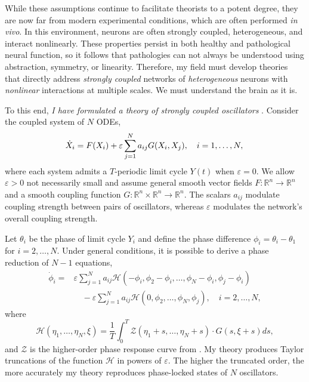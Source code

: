 \documentclass[a4paper,11pt]{article}
\newcommand{\ve}{\varepsilon}
\newcommand{\h}{\mathcal{H}}
\begin{document}
	While these assumptions continue to facilitate theorists to a potent degree, they are now far from modern experimental conditions, which are often performed \textit{in vivo}. In this environment, neurons are often strongly coupled, heterogeneous, and interact nonlinearly. These properties persist in both healthy and pathological neural function, so it follows that pathologies can not always be understood using abstraction, symmetry, or linearity. Therefore, my field must develop theories that directly address \textit{strongly coupled} networks of \textit{heterogeneous} neurons with \textit{nonlinear} interactions at multiple scales. We must understand the brain as it is.
	
	To this end, \textit{I have formulated a theory of strongly coupled oscillators} \cite{park2021high}. Consider the coupled system of $N$ ODEs,
	\begin{equation}\label{eq:odes}
		\dot X_i = F(X_i) +\ve \sum_{j=1}^N a_{ij} G(X_i,X_j), \quad i=1,\ldots,N,\\
	\end{equation}
	where each system admits a $T$-periodic limit cycle $Y(t)$ when $\ve=0$. We allow $\ve>0$ not necessarily small and assume general smooth vector fields $F:\mathbb{R}^n \rightarrow \mathbb{R}^n$ and a smooth coupling function $G:\mathbb{R}^n\times\mathbb{R}^n\rightarrow \mathbb{R}^n$. The scalars $a_{ij}$ modulate coupling strength between pairs of oscillators, whereas $\ve$ modulates the network's overall coupling strength.
	
	Let $\theta_i$ be the phase of limit cycle $Y_i$ and define the phase difference $\phi_i=\theta_i-\theta_1$ for $i=2,\ldots,N$. Under general conditions, it is possible to derive a phase reduction of $N-1$ equations,
	\begin{align*}
		\dot \phi_i =& \ve\sum_{j=1}^N a_{ij} \h(-\phi_i,\phi_2-\phi_i,\ldots,\phi_N-\phi_i,\phi_j-\phi_i)\\
		&\quad- \ve\sum_{j=1}^N a_{ij} \h(0,\phi_2,\ldots,\phi_N,\phi_j), \quad i=2,\ldots,N,
	\end{align*}
	where
	\begin{equation*}
		\h(\eta_1,\ldots,\eta_N,\xi) = \frac{1}{T} \int_0^T \mathcal{Z}(\eta_1+s,\ldots,\eta_N+s) \cdot G(s,\xi+s)ds,
	\end{equation*}
	and $\mathcal{Z}$ is the higher-order phase response curve from \cite{wilson2020phase}. My theory produces Taylor truncations of the function $\h$ in powers of $\ve$. The higher the truncated order, the more accurately my theory reproduces phase-locked states of $N$ oscillators.
	
\end{document}
